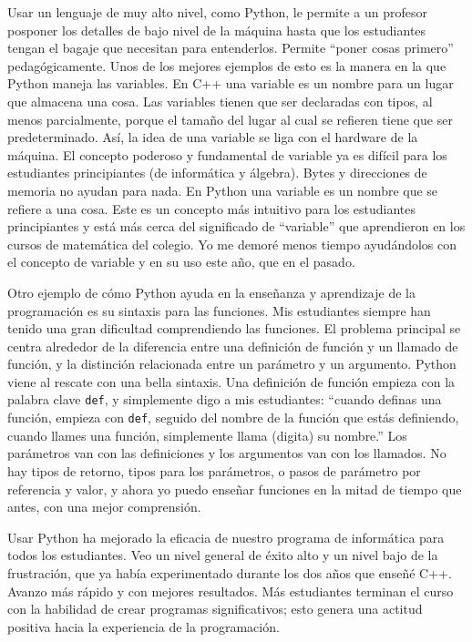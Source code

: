 Usar un lenguaje de muy alto nivel, como Python, le permite a un profesor 
posponer los detalles de bajo nivel de la máquina hasta que los estudiantes 
tengan el bagaje que necesitan para entenderlos. Permite  ``poner cosas 
primero'' pedagógicamente.  Unos de los mejores ejemplos de esto es la manera 
en la que Python maneja las variables.  
En C++ una variable es un nombre para un lugar que almacena una cosa. Las 
variables tienen que ser declaradas  con tipos, al menos parcialmente, 
porque el tamaño del lugar al cual se refieren tiene que ser predeterminado.  
Así, la idea de una variable se liga con el hardware de la máquina.  El 
concepto poderoso y fundamental de  variable ya es difícil para los estudiantes 
principiantes (de informática y álgebra). Bytes y direcciones de memoria no 
ayudan para nada. En Python una variable es un nombre que  se refiere a una 
cosa.  Este es un concepto más intuitivo para los estudiantes 
principiantes y está más cerca del significado de ``variable'' que aprendieron 
en los cursos de matemática del colegio. Yo me demoré menos tiempo ayudándolos 
con el concepto de variable y en su uso este año, que en el pasado.

Otro ejemplo de cómo Python ayuda en la enseñanza y aprendizaje de la 
programación es su sintaxis para las funciones.  Mis estudiantes siempre han 
tenido una gran  dificultad comprendiendo las funciones.  El problema principal 
se centra alrededor de la diferencia entre una definición de función y un 
llamado de  función, y la distinción relacionada entre un parámetro y un 
argumento.  Python viene al rescate con una bella sintaxis.  Una definición de 
función empieza con la palabra clave \texttt{def}, y simplemente digo a mis 
estudiantes: ``cuando definas una función, empieza con \texttt{def}, seguido 
del nombre de la función que estás definiendo, cuando llames una función, 
simplemente llama (digita) su nombre.''  Los parámetros van con las 
definiciones y los argumentos van con los llamados.  
No hay tipos de retorno, tipos para los parámetros, o pasos de parámetro por 
referencia y valor, y ahora yo puedo enseñar funciones en la mitad de tiempo 
que antes, con una mejor comprensión. 

Usar Python ha mejorado la eficacia de nuestro programa de informática para 
todos los estudiantes.  Veo un nivel general de éxito alto y un nivel bajo de
la frustración, que ya había experimentado durante los dos años que enseñé 
C++.  Avanzo más rápido y con mejores resultados.  Más estudiantes terminan el 
curso con la habilidad de  crear programas significativos; esto genera  una 
actitud positiva hacia la experiencia de la programación.

